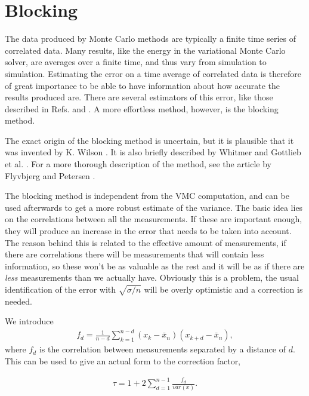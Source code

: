 \section{Blocking}
	\label{sec:blocking}
		The data produced by Monte Carlo methods are typically a finite time series of correlated data. Many results, like the energy in the variational Monte Carlo solver, are averages over a finite time, and thus vary from simulation to simulation. Estimating the error on a time average of correlated data is therefore of great importance to be able to have information about how accurate the results produced are. There are several estimators of this error, like those described in Refs. \cite{binder1984} and \cite{daniell1984}. A more effortless method, however, is the blocking method. 

		The exact origin of the blocking method is uncertain, but it is plausible that it was invented by K. Wilson \cite{Wilson1980}. It is also briefly described by Whitmer \cite{whitmer1984} and Gottlieb et al. \cite{gottlieb1986}. For a more thorough description of the method, see the article by Flyvbjerg and Petersen \cite{flyvbjerg1989}. 

		The blocking method is independent from the VMC computation, and can be used afterwards to get a more robust estimate of the variance. The basic idea lies on the correlations between all the measurements. If these are important enough, they will produce an increase in the error that needs to be taken into account. The reason behind this is related to the effective amount of measurements, if there are correlations there will be measurements that will contain less information, so these won't be as valuable as the rest and it will be as if there are \textit{less} measurements than we actually have. Obviously this is a problem, the usual identification of the error with $\sqrt{\sigma/n}$ will be overly optimistic and a correction is needed. 

		We introduce
		\begin{align}
			f_d=\frac{1}{n-d}\sum_{k=1}^{n-d}{\left(x_k-\bar{x}_n\right)\left(x_{k+d}-\bar{x}_n\right)},
		\end{align}
		where $f_d$ is the correlation between measurements separated by a distance of $d$. This can be used to give an actual form to the correction factor,

		\begin{align}
			\tau=1+2\sum_{d=1}^{n-1}{\frac{f_d}{var\left(x\right)}}.
		\end{align}

